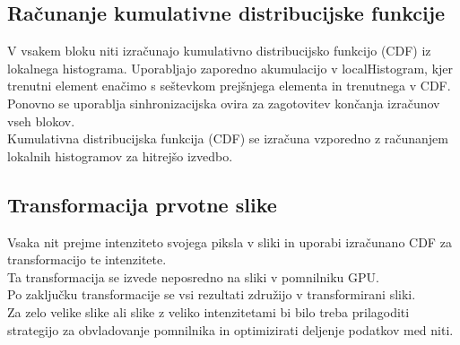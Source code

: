 \documentclass{article}
\begin{document}
\subsection{Računanje kumulativne distribucijske funkcije}
V vsakem bloku niti izračunajo kumulativno distribucijsko funkcijo (CDF) iz lokalnega histograma.
Uporabljajo zaporedno akumulacijo v localHistogram, kjer trenutni element enačimo s seštevkom prejšnjega elementa in trenutnega v CDF.\\
Ponovno se uporablja sinhronizacijska ovira za zagotovitev končanja izračunov vseh blokov.\\
Kumulativna distribucijska funkcija (CDF) se izračuna vzporedno z računanjem lokalnih histogramov za hitrejšo izvedbo.

\subsection{Transformacija prvotne slike}
Vsaka nit prejme intenziteto svojega piksla v sliki in uporabi izračunano CDF za transformacijo te intenzitete.\\
Ta transformacija se izvede neposredno na sliki v pomnilniku GPU.\\
Po zaključku transformacije se vsi rezultati združijo v transformirani sliki.\\
Za zelo velike slike ali slike z veliko intenzitetami bi bilo treba prilagoditi strategijo za obvladovanje pomnilnika in optimizirati deljenje podatkov med niti.
\end{document}
